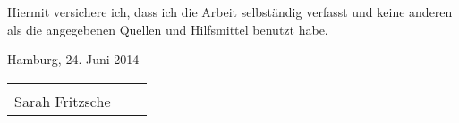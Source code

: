 


\begin{declaration}        %

Hiermit versichere ich, dass ich die Arbeit selbständig verfasst und keine anderen als die angegebenen Quellen und Hilfsmittel benutzt habe.

\vspace{15mm}

Hamburg, 24. Juni 2014

\vspace{1,5 cm} 
\begin{tabular}{p{7cm}p{.5cm}l}
\hline \\ 
Sarah Fritzsche
\end{tabular}%


\end{declaration}


